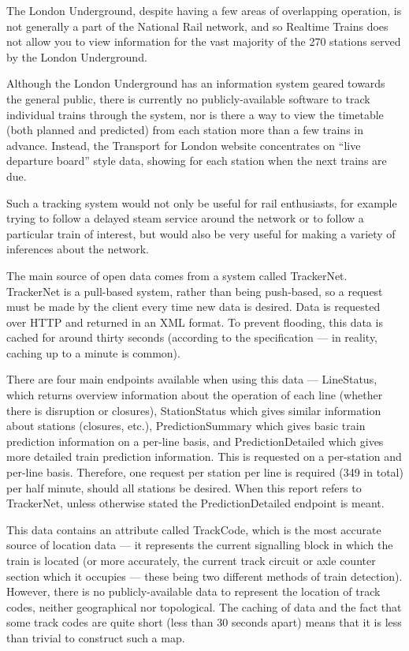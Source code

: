 \documentclass[a4paper,12pt]{article}
\begin{document}
The London Underground, despite having a few areas of overlapping operation, is
not generally a part of the National Rail network, and so Realtime Trains does
not allow you to view information for the vast majority of the 270 stations
served by the London Underground.

Although the London Underground has an information system geared towards the
general public, there is currently no publicly-available software to track
individual trains through the system, nor is there a way to view the timetable
(both planned and predicted) from each station more than a few trains in
advance. Instead, the Transport for London website concentrates on ``live
departure board'' style data, showing for each station when the next trains are
due.

Such a tracking system would not only be useful for rail enthusiasts, for
example trying to follow a delayed steam service around the network or to
follow a particular train of interest, but would also be very useful for making
a variety of inferences about the network.

The main source of open data comes from a system called TrackerNet. TrackerNet
is a pull-based system, rather than being push-based, so a request must be made
by the client every time new data is desired. Data is requested over HTTP and
returned in an XML format. To prevent flooding, this data is cached for around
thirty seconds (according to the specification --- in reality, caching up to a
minute is common).

There are four main endpoints available when using this data --- LineStatus,
which returns overview information about the operation of each line (whether
there is disruption or closures), StationStatus which gives similar information
about stations (closures, etc.), PredictionSummary which gives basic train
prediction information on a per-line basis, and PredictionDetailed which gives
more detailed train prediction information. This is requested on a per-station
and per-line basis\cite{TrackerNetSpec}. Therefore, one request per station per
line is required (349 in total) per half minute, should all stations be
desired. When this report refers to TrackerNet, unless otherwise stated the
PredictionDetailed endpoint is meant.

This data contains an attribute called TrackCode, which is the most accurate
source of location data --- it represents the current signalling block in which
the train is located (or more accurately, the current track circuit or axle
counter section which it occupies --- these being two different methods of train
detection). However, there is no publicly-available data to represent the
location of track codes, neither geographical nor topological. The caching of
data and the fact that some track codes are quite short (less than 30 seconds
apart) means that it is less than trivial to construct such a map.
\end{document}
